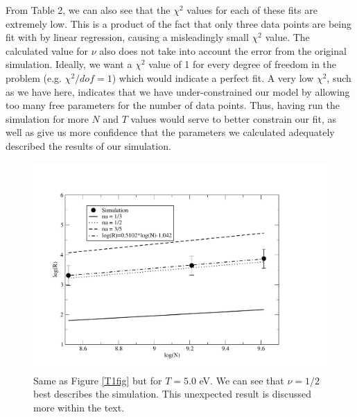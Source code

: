\documentclass{article}
\begin{document}
\begin{multicols}{2}
From Table 2, we can also see that the $\chi^2$ values for each of these fits are extremely low.  This is a product of the fact that only three data points are being fit with by linear regression, causing a misleadingly small $\chi^2$ value.  The calculated value for $\nu$ also does not take into account the error from the original simulation.  Ideally, we want a $\chi^2$ value of 1 for every degree of freedom in the problem (e.g. $\chi ^2/dof =1$) which would indicate a perfect fit.  A very low $\chi ^2$, such as we have here, indicates that we have under-constrained our model by allowing too many free parameters for the number of data points. Thus, having run the simulation for more $N$ and $T$ values would serve to better constrain our fit, as well as give us more confidence that the parameters we calculated adequately described the results of our simulation.\\

\begin{figure}[H]
\begin{center}
\includegraphics[width=\linewidth]{Figures/T5plot.pdf}
\caption{Same as Figure \ref{T1fig} but for $T=5.0$ eV.  We can see that $\nu = 1/2$ best describes the simulation.  This unexpected result is discussed more within the text.}
\label{T5fig}
\end{center}
\end{figure}


\end{multicols}
\end{document}
